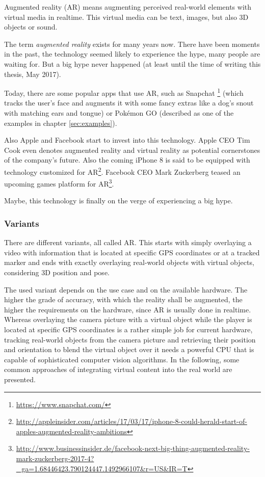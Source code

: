 Augmented reality (AR) means augmenting perceived real-world elements with virtual media in realtime. This virtual media can be text, images, but also 3D objects or sound.

The term \emph{augmented reality} exists for many years now. There have been moments in the past, the technology seemed likely to experience the hype, many people are waiting for. But a big hype never happened (at least until the time of writing this thesis, May 2017).

Today, there are some popular apps that use AR, such as Snapchat \footnote{\url{https://www.snapchat.com/}} (which tracks the user's face and augments it with some fancy extras like a dog's snout with matching ears and tongue) or Pok\'{e}mon GO (described as one of the examples in chapter \ref{sec:examples}).

Also Apple and Facebook start to invest into this technology. Apple CEO Tim Cook even denotes augmented reality and virtual reality as potential cornerstones of the company's future. Also the coming iPhone 8 is said to be equipped with technology customized for AR\footnote{\url{http://appleinsider.com/articles/17/03/17/iphone-8-could-herald-start-of-apples-augmented-reality-ambitions}}. Facebook CEO Mark Zuckerberg teased an upcoming games platform for AR\footnote{\url{http://www.businessinsider.de/facebook-next-big-thing-augmented-reality-mark-zuckerberg-2017-4?_ga=1.68446423.790124447.1492966107&r=US&IR=T}}.

Maybe, this technology is finally on the verge of experiencing a big hype.

\subsubsection{Variants}
There are different variants, all called AR. This starts with simply overlaying a video with information that is located at specific GPS coordinates or at a tracked marker and ends with exactly overlaying real-world objects with virtual objects, considering 3D position and pose.

The used variant depends on the use case and on the available hardware. The higher the grade of accuracy, with which the reality shall be augmented, the higher the requirements on the hardware, since AR is usually done in realtime. Whereas overlaying the camera picture with a virtual object while the player is located at specific GPS coordinates is a rather simple job for current hardware, tracking real-world objects from the camera picture and retrieving their position and orientation to blend the virtual object over it needs a powerful CPU that is capable of sophisticated computer vision algorithms. In the following, some common approaches of integrating virtual content into the real world are presented.

